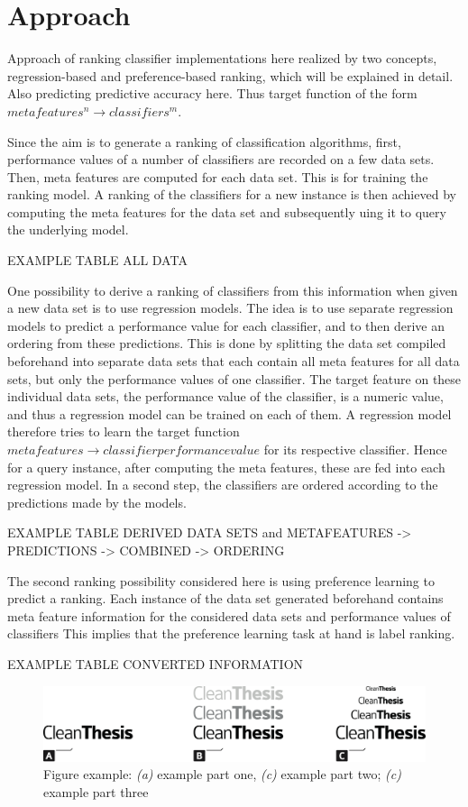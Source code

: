 %
\chapter{Approach}
\label{sec:approach}

Approach of ranking classifier implementations here realized by two concepts, regression-based and preference-based ranking, which will be explained in detail. Also predicting predictive accuracy here. Thus target function of the form $meta features^n \rightarrow classifiers^m$.

Since the aim is to generate a ranking of classification algorithms, first, performance values of a number of classifiers are recorded on a few data sets. Then, meta features are computed for each data set. This is for training the ranking model. A ranking of the classifiers for a new instance is then achieved by computing the meta features for the data set and subsequently uing it to query the underlying model. 

EXAMPLE TABLE ALL DATA

One possibility to derive a ranking of classifiers from this information when given a new data set is to use regression models. The idea is to use separate regression models to predict a performance value for each classifier, and to then derive an ordering from these predictions. This is done by splitting the data set compiled beforehand into separate data sets that each contain all meta features for all data sets, but only the performance values of one classifier. The target feature on these individual data sets, the performance value of the classifier, is a numeric value, and thus a regression model can be trained on each of them. A regression model therefore tries to learn the target function $meta features \rightarrow classifier performance value$ for its respective classifier. Hence for a query instance, after computing the meta features, these are fed into each regression model. In a second step, the classifiers are ordered according to the predictions made by the models.

EXAMPLE TABLE DERIVED DATA SETS and METAFEATURES -> PREDICTIONS -> COMBINED -> ORDERING

The second ranking possibility considered here is using preference learning to predict a ranking. Each instance of the data set generated beforehand contains meta feature information for the considered data sets and performance values of classifiers This implies that the preference learning task at hand is label ranking. 

EXAMPLE TABLE CONVERTED INFORMATION

\begin{figure}[htb]
	\includegraphics[width=\textwidth]{gfx/Clean-Thesis-Figure}
	\caption{Figure example: \textit{(a)} example part one, \textit{(c)} example part two; \textit{(c)} example part three}
	\label{fig:system:example1}
\end{figure}


